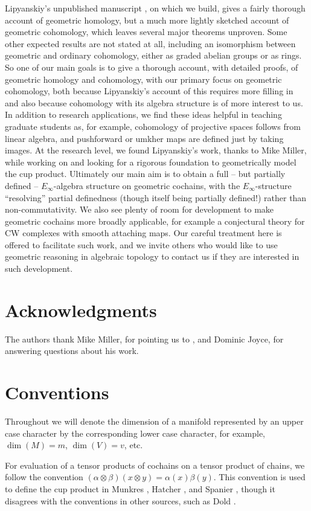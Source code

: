 Lipyanskiy's unpublished manuscript \cite{Lipy14}, on which we build, gives a fairly thorough account of geometric homology, but a much more lightly sketched account of geometric cohomology, which leaves several major theorems unproven.
Some other expected results are not stated at all, including an isomorphism between geometric and ordinary cohomology, either as graded abelian groups or as rings.
So one of our main goals is to give a thorough account, with detailed proofs, of geometric homology and cohomology, with our primary focus on geometric cohomology, both because Lipyanskiy's account of this requires more filling in and also because cohomology with its algebra structure is of more interest to us.
In addition to research applications, we find these ideas helpful in teaching graduate students as, for example, cohomology of projective spaces follows from linear algebra, and pushforward or umkher maps are defined just by taking images.
At the research level, we found Lipyanskiy's work, thanks to Mike Miller, while working on \cite{FMS-flows} and looking for a rigorous foundation to geometrically model the cup product.
Ultimately our main aim is to obtain a full -- but partially defined -- $E_\infty$-algebra structure on geometric cochains, with the $E_\infty$-structure ``resolving'' partial definedness (though itself being partially defined!) rather than non-commutativity.
We also see plenty of room for development to make geometric cochains more broadly applicable, for example a conjectural theory for CW complexes with smooth attaching maps.
Our careful treatment here is offered to facilitate such work, and we invite others who would like to use geometric reasoning in algebraic topology to contact us if they are interested in such development.

\section*{Acknowledgments}

The authors thank Mike Miller, for pointing us to \cite{Lipy14}, and Dominic Joyce, for answering questions about his work.

\section*{Conventions}

Throughout we will denote the dimension of a manifold represented by an upper case character by the corresponding lower case character, for example, $\dim(M)=m$, $\dim(V)=v$, etc.


For evaluation of a tensor products of cochains on a tensor product of chains, we follow the convention  $(\alpha\otimes \beta)(x\otimes y)=\alpha(x)\beta(y)$. This convention is used to define the cup product in Munkres \cite[Section 60]{Mun84}, Hatcher \cite[Section 3.2]{Hatc02}, and Spanier \cite[Section 5.6]{Span81}, though it disagrees with the conventions in other sources, such as Dold \cite[Section VII.7]{Dol72}.
